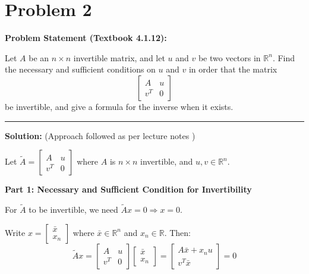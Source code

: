 \clearpage
\section*{Problem 2}

\textbf{Problem Statement (Textbook 4.1.12):} 

Let $A$ be an $n \times n$ invertible matrix, and let $u$ and $v$ be two vectors in $\mathbb{R}^n$. Find the necessary and sufficient conditions on $u$ and $v$ in order that the matrix
$$\begin{bmatrix} A & u \\ v^T & 0 \end{bmatrix}$$
be invertible, and give a formula for the inverse when it exists.

\noindent\rule{\textwidth}{0.4pt}

\vspace{1em}

\textbf{Solution:} (Approach followed as per lecture notes \cite{panchenko_448_notes})

Let $\tilde{A} = \begin{bmatrix} A & u \\ v^T & 0 \end{bmatrix}$ where $A$ is $n \times n$ invertible, and $u, v \in \mathbb{R}^n$. 

\vspace{0.5em}

\textbf{Part 1: Necessary and Sufficient Condition for Invertibility}

\vspace{0.5em}

For $\tilde{A}$ to be invertible, we need $\tilde{A}x = 0 \Rightarrow x = 0$. 

Write $x = \begin{bmatrix} \bar{x} \\ x_n \end{bmatrix}$ where $\bar{x} \in \mathbb{R}^n$ and $x_n \in \mathbb{R}$. Then:
$$\tilde{A}x = \begin{bmatrix} A & u \\ v^T & 0 \end{bmatrix} \begin{bmatrix} \bar{x} \\ x_n \end{bmatrix} = \begin{bmatrix} A\bar{x} + x_n u \\ v^T\bar{x} \end{bmatrix} = 0$$

